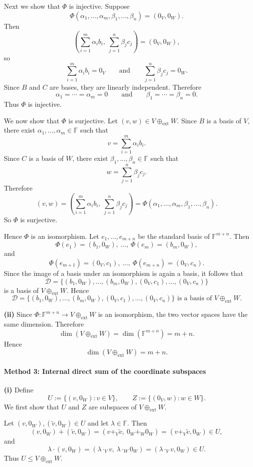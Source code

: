 \documentclass[12pt]{article}
\begin{document}
Next we show that \(\Phi\) is injective. Suppose
\[
\Phi(\alpha_1,\ldots,\alpha_m,\beta_1,\ldots,\beta_n)=(0_V,0_W).
\]
Then
\[
\left(\sum_{i=1}^m \alpha_i b_i,\ \sum_{j=1}^n \beta_j c_j\right)=(0_V,0_W),
\]
so
\[
\sum_{i=1}^m \alpha_i b_i=0_V
\qquad\text{and}\qquad
\sum_{j=1}^n \beta_j c_j=0_W.
\]
Since \(B\) and \(C\) are bases, they are linearly independent. Therefore
\[
\alpha_1=\cdots=\alpha_m=0
\qquad\text{and}\qquad
\beta_1=\cdots=\beta_n=0.
\]
Thus \(\Phi\) is injective.

We now show that \(\Phi\) is surjective. Let \((v,w)\in V\oplus_{\mathrm{ext}}W\). Since \(B\) is a basis of \(V\), there exist \(\alpha_1,\ldots,\alpha_m\in\mathbb F\) such that
\[
v=\sum_{i=1}^m \alpha_i b_i.
\]
Since \(C\) is a basis of \(W\), there exist \(\beta_1,\ldots,\beta_n\in\mathbb F\) such that
\[
w=\sum_{j=1}^n \beta_j c_j.
\]
Therefore
\[
(v,w)=\left(\sum_{i=1}^m \alpha_i b_i,\ \sum_{j=1}^n \beta_j c_j\right)
=\Phi(\alpha_1,\ldots,\alpha_m,\beta_1,\ldots,\beta_n).
\]
So \(\Phi\) is surjective.

Hence \(\Phi\) is an isomorphism. Let \(e_1,\ldots,e_{m+n}\) be the standard basis of \(\mathbb F^{m+n}\). Then
\[
\Phi(e_1)=(b_1,0_W),\ \ldots,\ \Phi(e_m)=(b_m,0_W),
\]
and
\[
\Phi(e_{m+1})=(0_V,c_1),\ \ldots,\ \Phi(e_{m+n})=(0_V,c_n).
\]
Since the image of a basis under an isomorphism is again a basis, it follows that
\[
\mathcal D
=
\{(b_1,0_W),\ldots,(b_m,0_W),(0_V,c_1),\ldots,(0_V,c_n)\}
\]
is a basis of \(V\oplus_{\mathrm{ext}}W\). Hence
\[
\boxed{\mathcal D=\{(b_1,0_W),\ldots,(b_m,0_W),(0_V,c_1),\ldots,(0_V,c_n)\}\text{ is a basis of }V\oplus_{\mathrm{ext}}W.}
\]

\noindent \textbf{(ii)} Since \(\Phi:\mathbb F^{m+n}\to V\oplus_{\mathrm{ext}}W\) is an isomorphism, the two vector spaces have the same dimension. Therefore
\[
\dim(V\oplus_{\mathrm{ext}}W)=\dim(\mathbb F^{m+n})=m+n.
\]
Hence
\[
\boxed{\dim(V\oplus_{\mathrm{ext}}W)=m+n.}
\]
\newpage
\paragraph{Method 3: Internal direct sum of the coordinate subspaces}

\noindent \textbf{(i)} Define
\[
U:=\{(v,0_W):v\in V\},
\qquad
Z:=\{(0_V,w):w\in W\}.
\]
We first show that \(U\) and \(Z\) are subspaces of \(V\oplus_{\mathrm{ext}}W\).

Let \((v,0_W),(\tilde v,0_W)\in U\) and let \(\lambda\in\mathbb F\). Then
\[
(v,0_W)+(\tilde v,0_W)=(v+_V\tilde v,\ 0_W+_W0_W)=(v+_V\tilde v,0_W)\in U,
\]
and
\[
\lambda\cdot(v,0_W)=(\lambda\cdot_V v,\ \lambda\cdot_W 0_W)=(\lambda\cdot_V v,0_W)\in U.
\]
Thus \(U\le V\oplus_{\mathrm{ext}}W\).
\end{document}
